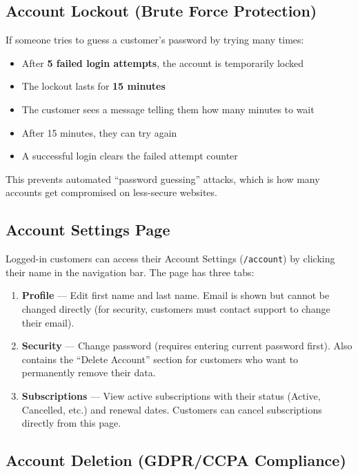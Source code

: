 \documentclass[12pt, letterpaper, oneside]{book}
\begin{document}
\subsection*{Account Lockout (Brute Force Protection)}

If someone tries to guess a customer's password by trying many times:

\begin{itemize}[leftmargin=2em]
  \item After \textbf{5 failed login attempts}, the account is temporarily locked
  \item The lockout lasts for \textbf{15 minutes}
  \item The customer sees a message telling them how many minutes to wait
  \item After 15 minutes, they can try again
  \item A successful login clears the failed attempt counter
\end{itemize}

This prevents automated ``password guessing'' attacks, which is how many accounts get compromised on less-secure websites.

\subsection*{Account Settings Page}

Logged-in customers can access their Account Settings (\texttt{/account}) by clicking their name in the navigation bar. The page has three tabs:

\begin{enumerate}[leftmargin=2em]
  \item \textbf{Profile} --- Edit first name and last name. Email is shown but cannot be changed directly (for security, customers must contact support to change their email).
  \item \textbf{Security} --- Change password (requires entering current password first). Also contains the ``Delete Account'' section for customers who want to permanently remove their data.
  \item \textbf{Subscriptions} --- View active subscriptions with their status (Active, Cancelled, etc.) and renewal dates. Customers can cancel subscriptions directly from this page.
\end{enumerate}

\subsection*{Account Deletion (GDPR/CCPA Compliance)}
\end{document}
